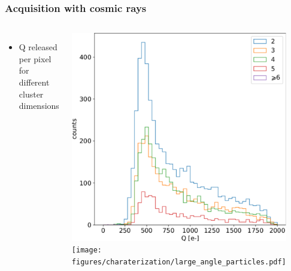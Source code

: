     \begin{frame}
        \frametitle{Acquisition with cosmic rays}
        \begin{columns}
                \begin{itemize}
                    \item Q released per pixel for different cluster dimensions 
                \end{itemize}
                \bigskip
                \includegraphics[width=1.1\linewidth]{figures/charaterization/cosmic_rays_spectrum_per_pixel.pdf} 
            \centering\texttt{[image: figures/charaterization/large\_angle\_particles.pdf]}
                \begin{figure}
                    \includegraphics[width=.3\linewidth]{figures/charaterization/evts/cosmic_rays/11a.png}

\end{figure}
\end{columns}
\end{frame}

